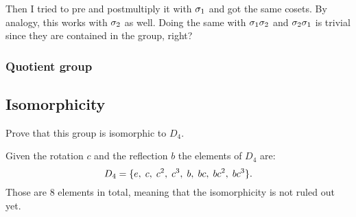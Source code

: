 \documentclass[11pt, english, fleqn, DIV=15, headinclude, BCOR=1cm]{scrartcl}
\begin{document}
Then I tried to pre and postmultiply it with $\sigma_1$ and got the same cosets. By
analogy, this works with $\sigma_2$ as well. Doing the same with $\sigma_1\sigma_2$ and $\sigma_2\sigma_1$ is
trivial since they are contained in the group, right?

\subsubsection{Quotient group}

\subsection{Isomorphicity}

\begin{problem}
    Prove that this group is isomorphic to $D_4$.
\end{problem}

Given the rotation $c$ and the reflection $b$ the elements of $D_4$ are:
\[
    D_4 = \{ e,\; c,\; c^2,\; c^3,\; b,\; bc,\; bc^2,\; bc^3 \}.
\]
Those are 8 elements in total, meaning that the isomorphicity is not ruled out
yet.
\end{document}
